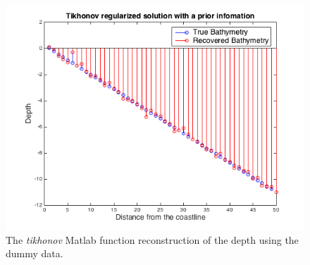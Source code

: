 \begin{figure}[H]
\center
\includegraphics[scale=0.6]{img/Tikhnove_reg.png} 
\caption{The \textit{tikhonov }Matlab function reconstruction of the depth using the dummy data.}
\label{TR-recon}
\end{figure}










%
%
%
%
%

